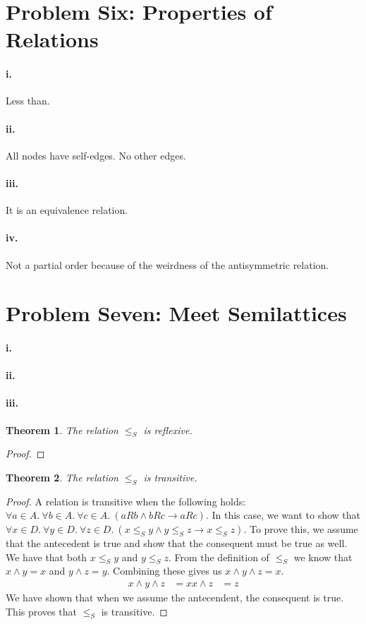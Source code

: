 \documentclass[10pt,letter]{article}
\newtheorem*{thm}{Theorem}
\begin{document}
\section*{Problem Six: Properties of Relations}

\paragraph{i.} Less than.
\paragraph{ii.} All nodes have self-edges. No other edges.
\paragraph{iii.} It is an equivalence relation.
\paragraph{iv.} Not a partial order because of the weirdness of the antisymmetric relation.

\section*{Problem Seven: Meet Semilattices}

\paragraph{i.} 
\paragraph{ii.}
\paragraph{iii.} 
\begin{thm} The relation $\le_S$ is reflexive. \end{thm}
\begin{proof} 
\end{proof}

\begin{thm} The relation $\le_S$ is transitive. \end{thm}
\begin{proof} A relation is transitive when the following holds: $\forall a \in A .\ \forall b \in A .\ \forall c \in A .\ (aRb \wedge bRc \rightarrow aRc)$. In this case, we want to show that $\forall x \in D .\ \forall y \in D .\ \forall z \in D .\ (x \le_S y \wedge y \le_S z \rightarrow x \le_S z)$. To prove this, we assume that the antecedent is true and show that the consequent must be true as well. We have that both $x \le_S y$ and $y \le_S z$. From the definition of $\le_S$ we know that $x \wedge y = x$ and $y \wedge z = y$. Combining these gives us $x \wedge y \wedge z = x$. 
\begin{align*}
x \wedge y \wedge z &= x
x \wedge z &= z
\end{align*}
We have shown that when we assume the antecendent, the consequent is true. This proves that $\le_S$ is transitive.
\end{proof}
\end{document}
